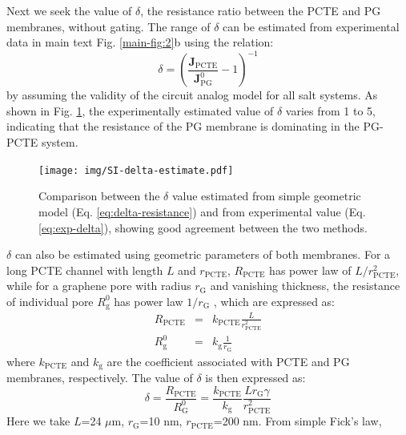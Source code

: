 \documentclass[manuscript=suppinfo,email=true, hyperref=true, keywords=false]{achemso}
\newcommand{\Fig}{Fig.}
\begin{document}
Next we seek the value of $\delta$, the resistance ratio
between the PCTE and PG membranes, without gating. The range
of $\delta$ can be estimated from experimental data in main text
\Fig{} \ref{main-fig:2}b using the relation:
\begin{equation}
  \label{eq:exp-delta}
  \delta = \left(\frac{\boldsymbol{J}_{\mathrm{PCTE}}}{\boldsymbol{J}_{\mathrm{PG}}^{0}} -1 \right)^{-1}
\end{equation}
by assuming the validity of the circuit analog model for all salt
systems. As shown in \Fig{} \ref{fig:delta-compare}, the
experimentally estimated value of $\delta$ varies from 1 to 5,
indicating that the resistance of the PG membrane is dominating in the
PG-PCTE system.
\begin{figure}[htbp]
  \centering
  \texttt{[image: img/SI-delta-estimate.pdf]}
  \caption{Comparison between the $\delta$ value estimated from simple
    geometric model (Eq. \ref{eq:delta-resistance}) and from
    experimental value (Eq. \ref{eq:exp-delta}), showing good
    agreement between the two methods.  }
  \label{fig:delta-compare}
\end{figure}
$\delta$ can also be estimated using geometric parameters of both
membranes. For a long PCTE channel with length $L$ and
$r_{\mathrm{PCTE}}$, $R_{\mathrm{PCTE}}$ has power law of
$L/r_{\mathrm{PCTE}}^{2}$, while for a graphene pore
with radius $r_{\mathrm{G}}$ and vanishing thickness, the resistance of individual pore $R_{\mathrm{g}}^{0}$
has power law $1/r_{\mathrm{G}}$ \cite{O_Hern_2014}, which are expressed as:
\begin{subequations}
\begin{eqnarray}
  \label{eq:R-both}
  R_{\mathrm{PCTE}} &= &k_{\mathrm{PCTE}} \frac{L}{r_{\mathrm{PCTE}}^{2}} \\
  R_{\mathrm{g}}^{0} &= &k_{\mathrm{g}} \frac{1}{r_{\mathrm{G}}}
\end{eqnarray}
\end{subequations}
where $k_{\mathrm{PCTE}}$ and $k_{\mathrm{g}}$ are the coefficient
associated with PCTE and PG membranes, respectively. The value of
$\delta$ is then expressed as:
\begin{equation}
  \label{eq:delta-resistance}
  \delta
  = \frac{R_{\mathrm{PCTE}}}{R_{\mathrm{G}}^{0}}
  = {\displaystyle
    \frac{k_{\mathrm{PCTE}}}{k_{\mathrm{g}}}
    \frac{L r_{\mathrm{G}} \gamma}
        {r_{\mathrm{PCTE}}^{2}}}
\end{equation}
Here we take $L$=24 $\mu$m, $r_{\mathrm{G}}$=10 nm,
$r_{\mathrm{PCTE}}$=200 nm. From simple Fick's law,
\end{document}

